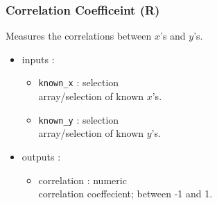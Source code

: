 \documentclass[12pt]{beamer}
\begin{document}
	\begin{frame}
		\frametitle{Correlation Coefficeint (R)}
		Measures the correlations between $x$'s and $y$'s. 
		\begin{itemize}
			\item inputs : 
			\begin{itemize}
				\item \texttt{known\_x} : selection \\
				array/selection of known $x$'s.
				\item \texttt{known\_y} : selection \\
				array/selection of known $y$'s.
			\end{itemize}
		\item outputs :
			\begin{itemize}
				\item correlation : numeric \\
				correlation coeffecient; between -1 and 1. 
			\end{itemize}
		\end{itemize}
	
	\end{frame}
\end{document}
